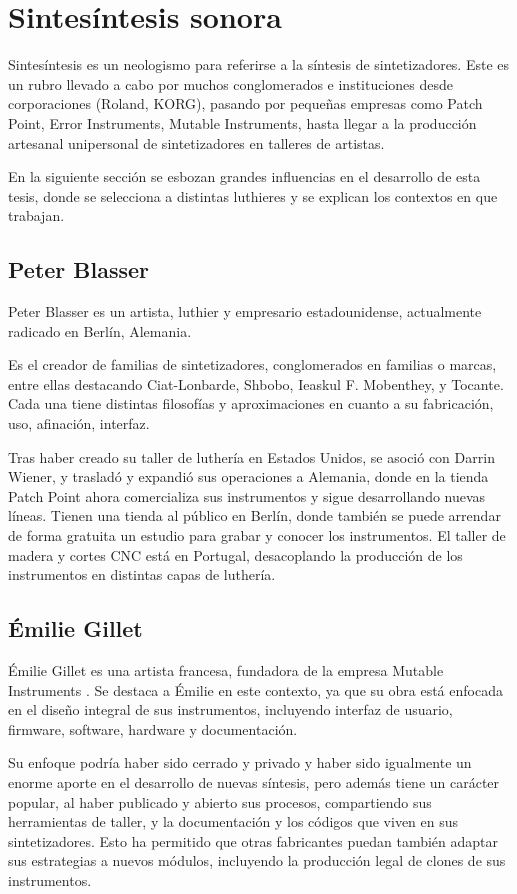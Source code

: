 \documentclass[../candidatura.tex]{subfiles}
\begin{document}
\section{Sintesíntesis sonora}

\avisoesbozo

Sintesíntesis es un neologismo para referirse a la síntesis de sintetizadores. Este es un rubro llevado a cabo por muchos conglomerados e instituciones desde corporaciones (Roland, KORG), pasando por pequeñas empresas como Patch Point, Error Instruments, Mutable Instruments, hasta llegar a la producción artesanal unipersonal de sintetizadores en talleres de artistas.

En la siguiente sección se esbozan grandes influencias en el desarrollo de esta tesis, donde se selecciona a distintas luthieres y se explican los contextos en que trabajan.

\subsection{Peter Blasser}

Peter Blasser es un artista, luthier y empresario estadounidense, actualmente radicado en Berlín, Alemania.

Es el creador de familias de sintetizadores, conglomerados en familias o marcas, entre ellas destacando Ciat-Lonbarde, Shbobo, Ieaskul F. Mobenthey, y Tocante. Cada una tiene distintas filosofías y aproximaciones en cuanto a su fabricación, uso, afinación, interfaz.

Tras haber creado su taller de luthería en Estados Unidos, se asoció con Darrin Wiener, y trasladó y expandió sus operaciones a Alemania, donde en la tienda Patch Point ahora comercializa sus instrumentos y sigue desarrollando nuevas líneas. Tienen una tienda al público en Berlín, donde también se puede arrendar de forma gratuita un estudio para grabar y conocer los instrumentos. El taller de madera y cortes CNC está en Portugal, desacoplando la producción de los instrumentos en distintas capas de luthería.

\subsection{Émilie Gillet}

Émilie Gillet es una artista francesa, fundadora de la empresa Mutable Instruments \parencite{perfectcircuit_mutableinstruments_sinfecha}. Se destaca a Émilie en este contexto, ya que su obra está enfocada en el diseño integral de sus instrumentos, incluyendo interfaz de usuario, firmware, software, hardware y documentación.

Su enfoque podría haber sido cerrado y privado y haber sido igualmente un enorme aporte en el desarrollo de nuevas síntesis, pero además tiene un carácter popular, al haber publicado y abierto sus procesos, compartiendo sus herramientas de taller, y la documentación y los códigos que viven en sus sintetizadores. Esto ha permitido que otras fabricantes puedan también adaptar sus estrategias a nuevos módulos, incluyendo la producción legal de clones de sus instrumentos.

\newpage
\end{document}
